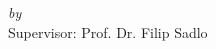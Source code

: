 \begin{titlepage}
  \vspace*{5cm}
  \makeatletter
  \begin{center}
    \begin{Huge}
      \@title
    \end{Huge}\\[1.0cm]
    \begin{Large}
      \@subtitle
    \end{Large}\\
    \emph{by}\\
    \@author
    \vfill
    Supervisor: Prof. Dr. Filip Sadlo
  \end{center}
  \makeatother
\end{titlepage}

\newpage
\null
\thispagestyle{empty}
\newpage
